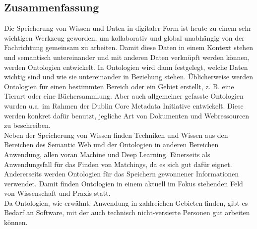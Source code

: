 %
\pagestyle{empty}

\subsection*{Zusammenfassung}

Die Speicherung von Wissen und Daten in digitaler Form ist heute zu einem sehr
wichtigen Werkzeug geworden, um kollaborativ und global unabhängig von der
Fachrichtung gemeinsam zu arbeiten. Damit diese Daten in einem Kontext stehen
und semantisch untereinander und mit anderen Daten verknüpft werden können,
werden Ontologien entwickelt. In Ontologien wird dann festgelegt, welche Daten
wichtig sind und wie sie untereinander in Beziehung stehen. Üblicherweise werden
Ontologien für einen bestimmten Bereich oder ein Gebiet erstellt, z. B. eine
Tierart oder eine Büchersammlung. Aber auch allgemeiner gefasste Ontologien
wurden u.a. im Rahmen der Dublin Core Metadata Initiative  entwickelt. Diese
werden konkret dafür benutzt, jegliche Art von Dokumenten und Webressourcen zu beschreiben.\\
Neben der Speicherung von Wissen finden Techniken und Wissen aus den Bereichen
des Semantic Web und der Ontologien in anderen Bereichen Anwendung, allen voran
Machine und Deep Learning. Einerseits als Anwendungsfall für das Finden von
Matchings, da es sich gut dafür eignet. Andererseits werden Ontologien für das
Speichern gewonnener Informationen verwendet. Damit finden Ontologien in einem
aktuell im Fokus stehenden Feld von Wissenschaft und Praxis statt.\\
Da Ontologien, wie erwähnt, Anwendung in zahlreichen Gebieten finden, gibt es
Bedarf an Software, mit der auch technisch nicht-versierte Personen gut arbeiten
können.

